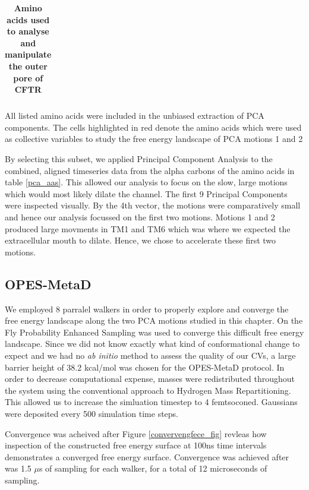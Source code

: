 \begin{table}
\begin{center}
{\begin{tabular} {| c | c | c | c | c | c | c | c | c | c | c | c | }
            



\end{tabular}%
}
\end{center}
\captionsetup{singlelinecheck = false, justification=raggedright}                           
\caption[Amino acids used to analyse and manipulate the outer pore of CFTR] {\textbf{Amino acids used to analyse and manipulate the outer pore of CFTR}}{All listed amino acids were included in the unbiased extraction of PCA components. The cells highlighted in red denote the amino acids which were used as collective variables to study the free energy landscape of PCA motions 1 and 2}

\end{table}
By selecting this subset, we applied Principal Component Analysis to the combined, aligned timeseries data from the alpha carbons of the amino acids in table \ref{pca_aas}. This allowed our analysis to focus on the slow, large motions which would most likely dilate the channel. The first 9 Principal Components were inspected visually. By the 4th vector, the motions were comparatively small and hence our analysis focussed on the first two motions. Motions 1 and 2 produced large movments in TM1 and TM6 which was where we expected the extracellular mouth to dilate. Hence, we chose to accelerate these first two motions.

\subsection{OPES-MetaD}
We employed 8 parralel walkers in order to properly explore and converge the free energy landscape along the two PCA motions studied in this chapter. On the Fly Probability Enhanced Sampling was used to converge this difficult free energy landscape. Since we did not know exactly what kind of conformational change to expect and we had no \textit {ab initio} method to assess the quality of our CVs, a large barrier height of 38.2 kcal/mol was chosen for the OPES-MetaD protocol. In order to decrease computational expense, masses were redistributed throughout the system using the conventional approach to Hydrogen Mass Repartitioning. This allowed us to increase the simluation timestep to 4 femtsoconed. Gaussians were deposited every 500 simulation time steps.

Convergence was acheived after  Figure \ref{convervengfece_fig} revleas how inspection of the constructed free energy surface at 100ns time intervals demonstrates a converged free energy surface. Convergence was achieved after  was 1.5 $\mu$s of sampling for each walker, for a total of 12 microseconds of sampling.

